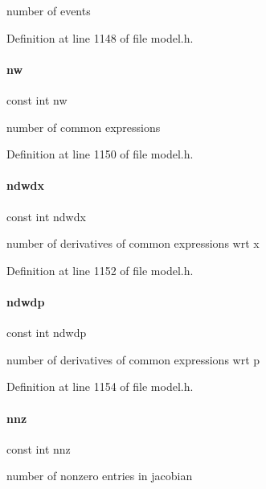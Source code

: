 number of events 

Definition at line 1148 of file model.\+h.

\mbox{\label{classamici_1_1_model_a196986a3a7c4a7dff1c90ae254db7795}} 
\paragraph{\texorpdfstring{nw}{nw}}
{\footnotesize\ttfamily const int nw}

number of common expressions 

Definition at line 1150 of file model.\+h.

\mbox{\label{classamici_1_1_model_a761315b22459d5ca307556f210aece6b}} 
\paragraph{\texorpdfstring{ndwdx}{ndwdx}}
{\footnotesize\ttfamily const int ndwdx}

number of derivatives of common expressions wrt x 

Definition at line 1152 of file model.\+h.

\mbox{\label{classamici_1_1_model_a1bd453ba21c508c3687f641d49430829}} 
\paragraph{\texorpdfstring{ndwdp}{ndwdp}}
{\footnotesize\ttfamily const int ndwdp}

number of derivatives of common expressions wrt p 

Definition at line 1154 of file model.\+h.

\mbox{\label{classamici_1_1_model_aab84622e454402438efd61cc36645abe}} 
\paragraph{\texorpdfstring{nnz}{nnz}}
{\footnotesize\ttfamily const int nnz}

number of nonzero entries in jacobian 

